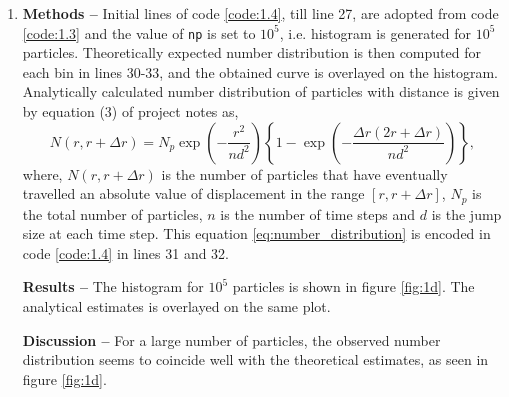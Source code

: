 \documentclass[a4paper]{article}
\begin{document}
\begin{enumerate} [label*=\textbf{(\alph*)}]
			\item 
				\subitem \textbf{Methods  --} 
					Initial lines of code \ref{code:1.4}, till line 27, are adopted from code \ref{code:1.3} and the value of \texttt{np} is set to \(10^5\), i.e. histogram is generated for \(10^5\) particles. Theoretically expected number distribution is then computed for each bin in lines 30-33, and the obtained curve is overlayed on the histogram. Analytically calculated number distribution of particles with distance is given by equation (3) of project notes as,
					\begin{equation}
						N(r,r+\Delta r) = N^{}_{p} \exp\left( -\frac{r^2_{}}{nd^2_{}} \right) \left\lbrace 1- \exp \left( - \frac{\Delta r (2r+\Delta r)}{nd^2_{}} \right) \right\rbrace ,
						\label{eq:number_distribution}
					\end{equation}
					where, \(N(r,r+\Delta r)\) is the number of particles that have eventually travelled an absolute value of displacement in the range \([r,r+\Delta r]\), \(N_p^{}\) is the total number of particles, \(n\) is the number of time steps and \(d\) is the jump size at each time step. This equation \ref{eq:number_distribution} is encoded in code \ref{code:1.4} in lines 31 and 32.
					\begin{figure} [h]
						
					\end{figure}
					
				\subitem \textbf{Results --} 
					The histogram for \(10^5\) particles is shown in figure \ref{fig:1d}. The analytical estimates is overlayed on the same plot. 
				
				\subitem \textbf{Discussion --}
					For a large number of particles, the observed number distribution seems to coincide well with the theoretical estimates, as seen in figure \ref{fig:1d}.
				
			

\end{enumerate}
\end{document}

